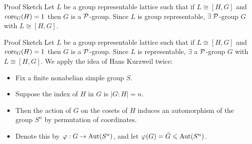 \documentclass[xcolor=dvipsnames,11pt,hide notes]{beamer}
\theoremstyle{definition}
\theoremstyle{remark}
\numberwithin{theorem}{section}
\numberwithin{claim}{section}
\numberwithin{equation}{section}
\numberwithin{conjecture}{section}
\begin{document}
\begin{frame}[label=IEPropsLemma2]{}
\alert{Proof Sketch}
\vskip2mm
  Let $L$ be a group representable lattice such that if $L\cong [H,G]$ and
  $\mathrm{core}_G(H)=1$ then $G$ is a $\mathcal{P}$-group.  
\vskip4mm
  Since $L$ is group representable, $\exists \; \mathcal{P}$-group $G$ with $L
  \cong [H,G]$. 
\vskip4mm
\end{frame}

\begin{frame}[label=IEPropsLemma2Alt]{}
\alert{Proof Sketch}
\vskip2mm
  Let $L$ be a group representable lattice such that if $L\cong [H,G]$ and
  $\mathrm{core}_G(H)=1$ then $G$ is a $\mathcal{P}$-group.  
\vskip4mm
  Since $L$ is representable, $\exists$ a $\mathcal{P}$-group $G$ with $L
  \cong [H,G]$. 
\vskip4mm
  We apply the idea of Hans Kurzweil twice:
  \begin{itemize}
  \item Fix a finite nonabelian simple group $S$. 
\vskip2mm
\item Suppose the index of $H$ in $G$ is $|G:H| = n$.
\vskip2mm
\item Then the action of $G$ on the cosets of $H$ induces an automorphism of the
group $S^n$ by permutation of coordinates.  
\vskip2mm
\item
Denote this by  $\varphi: G \rightarrow \mathrm{Aut}(S^n)$, 
  and let $\varphi(G) = \bar{G} \leqslant \mathrm{Aut}(S^n)$.  
  \end{itemize}
\end{frame}
\end{document}
